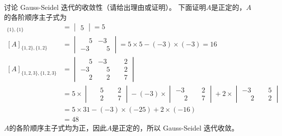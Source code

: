 \documentclass[11pt]{article}
\begin{document}
\begin{question}
\begin{subquestion}{讨论 Gauss-Seidel 迭代的收敛性（请给出理由或证明）。}
{            下面证明$A$是正定的，$A$的各阶顺序主子式为
            \begin{align*}
                [A]_{\{1\},\{1\}}         & =
                \begin{vmatrix}
                    5
                \end{vmatrix}
                = 5                                                                            \\
                [A]_{\{1,2\},\{1,2\}}     & =
                \begin{vmatrix}
                    \phantom{-}5 & -3           \\
                    -3           & \phantom{-}5
                \end{vmatrix}
                = 5 \times 5 - (-3) \times (-3)  = 16                                          \\
                [A]_{\{1,2,3\},\{1,2,3\}} & =
                \begin{vmatrix}
                    \phantom{-}5 & -3           & \phantom{-}2 \\
                    -3           & \phantom{-}5 & \phantom{-}2 \\
                    \phantom{-}2 & \phantom{-}2 & \phantom{-}7
                \end{vmatrix}                                                     \\
                                          & = 5 \times
                \begin{vmatrix}
                    \phantom{-}5 & \phantom{-}2 \\
                    \phantom{-}2 & \phantom{-}7
                \end{vmatrix}
                - (-3) \times
                \begin{vmatrix}
                    -3           & \phantom{-}2 \\
                    \phantom{-}2 & \phantom{-}7
                \end{vmatrix}
                + 2 \times
                \begin{vmatrix}
                    -3           & \phantom{-}5 \\
                    \phantom{-}2 & \phantom{-}2
                \end{vmatrix}                                                     \\
                                          & = 5 \times 31 - (-3) \times (-25) + 2 \times (-16) \\
                                          & = 48
            \end{align*}
            $A$的各阶顺序主子式均为正，因此$A$是正定的，所以 Gauss-Seidel 迭代收敛。
        }
    \end{subquestion}

\end{question}
\end{document}
